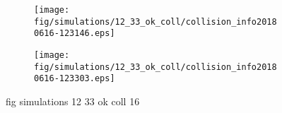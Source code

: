 \begin{figure}[H]
	\centering
	\begin{subfigure}[b]{0.8\textwidth}
		\texttt{[image: fig/simulations/12\_33\_ok\_coll/collision\_info20180616-123146.eps]}
		\caption{}
		\label{fig:simulations:12_33_ok_coll:collision_info20180616-123146}
	\end{subfigure}

	\begin{subfigure}[b]{0.8\textwidth}
		\texttt{[image: fig/simulations/12\_33\_ok\_coll/collision\_info20180616-123303.eps]}
		\caption{}
		\label{fig:simulations:12_33_ok_coll:collision_info20180616-123303}
	\end{subfigure}
	\caption{fig simulations 12 33 ok coll 16}
	\label{fig:simulations:12_33_ok_coll:16}
\end{figure}

